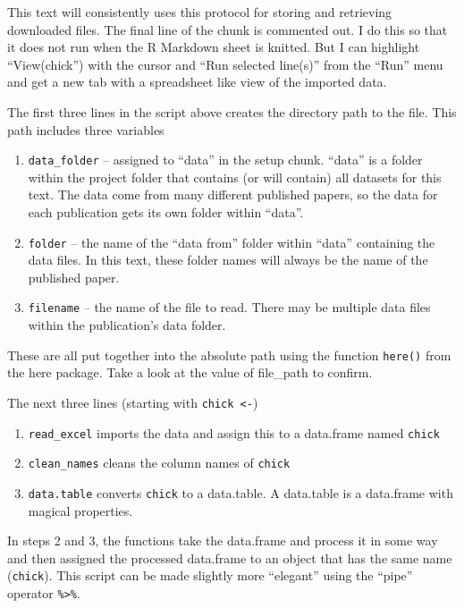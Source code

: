 \documentclass[]{book}
\providecommand{\tightlist}{%
  \setlength{\itemsep}{0pt}\setlength{\parskip}{0pt}}
\begin{document}
This text will consistently uses this protocol for storing and retrieving downloaded files. The final line of the chunk is commented out. I do this so that it does not run when the R Markdown sheet is knitted. But I can highlight ``View(chick'') with the cursor and ``Run selected line(s)'' from the ``Run'' menu and get a new tab with a spreadsheet like view of the imported data.

The first three lines in the script above creates the directory path to the file. This path includes three variables

\begin{enumerate}
\def\labelenumi{\arabic{enumi}.}
\tightlist
\item
  \texttt{data\_folder} -- assigned to ``data'' in the setup chunk. ``data'' is a folder within the project folder that contains (or will contain) all datasets for this text. The data come from many different published papers, so the data for each publication gets its own folder within ``data''.
\item
  \texttt{folder} -- the name of the ``data from'' folder within ``data'' containing the data files. In this text, these folder names will always be the name of the published paper.
\item
  \texttt{filename} -- the name of the file to read. There may be multiple data files within the publication's data folder.
\end{enumerate}

These are all put together into the absolute path using the function \texttt{here()} from the here package. Take a look at the value of file\_path to confirm.

The next three lines (starting with \texttt{chick\ \textless{}-})

\begin{enumerate}
\def\labelenumi{\arabic{enumi}.}
\tightlist
\item
  \texttt{read\_excel} imports the data and assign this to a data.frame named \texttt{chick}
\item
  \texttt{clean\_names} cleans the column names of \texttt{chick}
\item
  \texttt{data.table} converts \texttt{chick} to a data.table. A data.table is a data.frame with magical properties.
\end{enumerate}

In steps 2 and 3, the functions take the data.frame and process it in some way and then assigned the processed data.frame to an object that has the same name (\texttt{chick}). This script can be made slightly more ``elegant'' using the ``pipe'' operator \texttt{\%\textgreater{}\%}.
\end{document}
